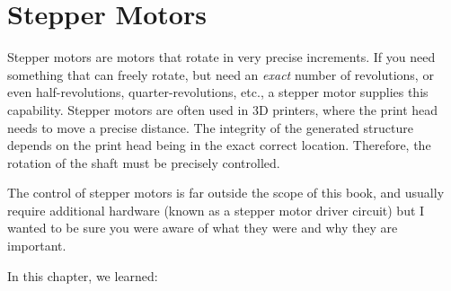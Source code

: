 \section{Stepper Motors}

Stepper motors are motors that rotate in very precise increments.
If you need something that can freely rotate, but need an \emph{exact} number of revolutions, or even half-revolutions, quarter-revolutions, etc., a stepper motor supplies this capability.
Stepper motors are often used in 3D printers, where the print head needs to move a precise distance.  
The integrity of the generated structure depends on the print head being in the exact correct location.
Therefore, the rotation of the shaft must be precisely controlled.

The control of stepper motors is far outside the scope of this book, and usually require additional hardware (known as a stepper motor driver circuit) but I wanted to be sure you were aware of what they were and why they are important.

\reviewsection

In this chapter, we learned:

